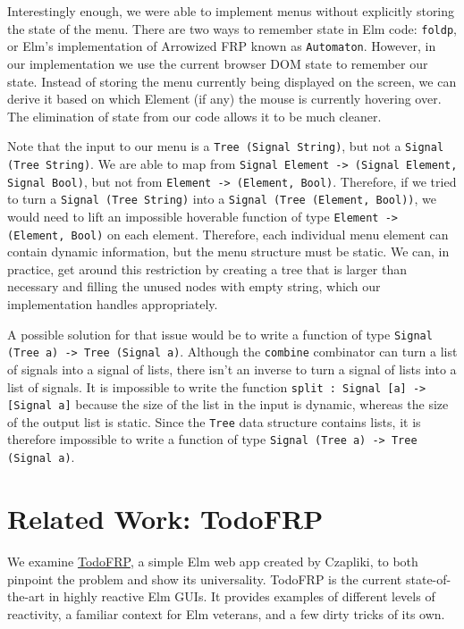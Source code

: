 \documentclass{article}
\begin{document}
Interestingly enough, we were able to implement menus without explicitly
storing the state of the menu. There are two ways to remember state in
Elm code: \texttt{foldp}, or Elm's implementation of Arrowized FRP known
as \texttt{Automaton}. However, in our implementation we use the current
browser DOM state to remember our state. Instead of storing the menu
currently being displayed on the screen, we can derive it based on which
Element (if any) the mouse is currently hovering over. The elimination
of state from our code allows it to be much cleaner.

Note that the input to our menu is a \texttt{Tree (Signal String)}, but
not a \texttt{Signal (Tree String)}. We are able to map from
\texttt{Signal Element -\textgreater{} (Signal Element, Signal Bool)},
but not from \texttt{Element -\textgreater{} (Element, Bool)}.
Therefore, if we tried to turn a \texttt{Signal (Tree String)} into a
\texttt{Signal (Tree (Element, Bool))}, we would need to lift an
impossible hoverable function of type
\texttt{Element -\textgreater{} (Element, Bool)} on each element.
Therefore, each individual menu element can contain dynamic information,
but the menu structure must be static. We can, in practice, get around
this restriction by creating a tree that is larger than necessary and
filling the unused nodes with empty string, which our implementation
handles appropriately.

A possible solution for that issue would be to write a function of type
\texttt{Signal (Tree a) -\textgreater{} Tree (Signal a)}. Although the
\texttt{combine} combinator can turn a list of signals into a signal of
lists, there isn't an inverse to turn a signal of lists into a list of
signals. It is impossible to write the function
\texttt{split : Signal {[}a{]} -\textgreater{} {[}Signal a{]}} because
the size of the list in the input is dynamic, whereas the size of the
output list is static. Since the \texttt{Tree} data structure contains
lists, it is therefore impossible to write a function of type
\texttt{Signal (Tree a) -\textgreater{} Tree (Signal a)}.

\section{Related Work: TodoFRP}\label{related-work-todofrp}

We examine \href{https://github.com/evancz/TodoFRP}{TodoFRP}, a simple
Elm web app created by Czapliki, to both pinpoint the problem and show
its universality. TodoFRP is the current state-of-the-art in highly
reactive Elm GUIs. It provides examples of different levels of
reactivity, a familiar context for Elm veterans, and a few dirty tricks
of its own.
\end{document}
